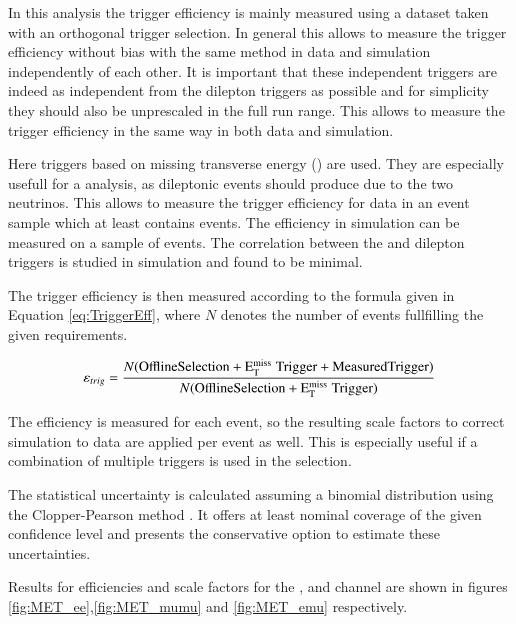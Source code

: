 In this analysis the trigger efficiency is mainly measured using a dataset taken with an orthogonal trigger selection.
In general this allows to measure the trigger efficiency without bias with the same method in data and simulation independently 
of each other. It is important that these independent triggers are indeed as independent from the dilepton triggers as possible
and for simplicity they should also be unprescaled in the full run range.  This allows to measure the trigger efficiency in the same
way in both data and simulation.

Here triggers based on missing transverse energy (\ETm) are used. They are especially usefull for a \ttbar analysis, 
as dileptonic \ttbar events should produce \ETm due to the two neutrinos. This allows to measure the trigger efficiency for data
in an event sample which at least contains \ttbar events. The efficiency in simulation can be measured on a sample of \ttbar events.
The correlation between the \ETm and dilepton triggers is studied in simulation and found to be minimal.

The trigger efficiency is then measured according to the formula given in Equation \ref{eq:TriggerEff}, where $N$ denotes the number of 
events fullfilling the given requirements.

\begin{equation}
\varepsilon_{trig} = \frac{N(\mathrm{Offline Selection + E_{\mathrm{T}}^{\text{miss}} \; Trigger + Measured Trigger})}{N(\mathrm{Offline Selection + E_{\mathrm{T}}^{\text{miss}} \; Trigger})}
\label{eq:TriggerEff}
\end{equation}

The efficiency is measured for each event, so the resulting scale factors to correct simulation to data are applied per event as well.
This is especially useful if a combination of multiple triggers is used in the selection.

The statistical uncertainty is calculated assuming a binomial distribution using the Clopper-Pearson method . It offers at least nominal coverage 
of the given confidence level and presents the conservative option to estimate these uncertainties. 

Results for efficiencies and scale factors for the \ee, \mumu and \emu channel are shown in figures \ref{fig:MET_ee},\ref{fig:MET_mumu} and \ref{fig:MET_emu} respectively.

